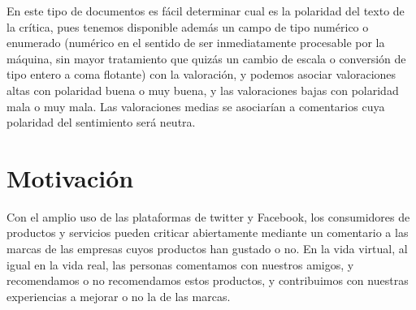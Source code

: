 En este tipo de documentos es fácil determinar cual es la polaridad del texto de la crítica, pues tenemos disponible además un campo de tipo numérico o enumerado (numérico en el sentido de ser inmediatamente procesable por la máquina, sin mayor tratamiento que quizás un cambio de escala o conversión de tipo entero a coma flotante) con la valoración, y podemos asociar valoraciones altas con polaridad buena o muy buena, y las valoraciones bajas con polaridad mala o muy mala. Las valoraciones medias se asociarían a comentarios cuya polaridad del sentimiento será neutra.


\section{Motivación}

Con el amplio uso de las plataformas de twitter y Facebook, los consumidores de productos y servicios pueden criticar abiertamente mediante un comentario a las marcas de las empresas cuyos productos han gustado o no. En la vida virtual, al igual en la vida real, las personas comentamos con nuestros amigos, y recomendamos o no recomendamos estos productos, y contribuimos con nuestras experiencias a mejorar o no la  de las marcas.


